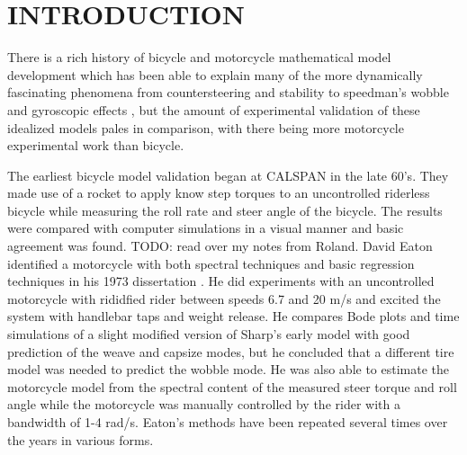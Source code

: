 \documentclass[twocolumn,10pt]{asme2e}
\begin{document}
\section*{INTRODUCTION}

There is a rich history of bicycle and motorcycle mathematical model
development which has been able to explain many of the more dynamically
fascinating phenomena from countersteering and stability to speedman's wobble
and gyroscopic effects \cite{Limebeer2006, Meijaard2007, Meijaard2011}, but the
amount of experimental validation of these idealized models pales in
comparison, with there being more motorcycle experimental work than bicycle.

The earliest bicycle model validation began at CALSPAN in the late 60's. They
made use of a rocket to apply know step torques to an uncontrolled riderless
bicycle while measuring the roll rate and steer angle of the bicycle. The
results were compared with computer simulations in a visual manner and basic
agreement was found. TODO: read over my notes from Roland. David Eaton
identified a motorcycle with both spectral techniques and basic regression
techniques in his 1973 dissertation \cite{Eaton1973}. He did experiments with
an uncontrolled motorcycle with rididfied rider between speeds 6.7 and 20 m/s
and excited the system with handlebar taps and weight release. He compares Bode
plots and time simulations of a slight modified version of Sharp's early model
\cite{Sharp1971} with good prediction of the weave and capsize modes, but he
concluded that a different tire model was needed to predict the wobble mode. He
was also able to estimate the motorcycle model from the spectral content of the
measured steer torque and roll angle while the motorcycle was manually
controlled by the rider with a bandwidth of 1-4 rad/s. Eaton's methods have been
repeated several times over the years in various forms.
\end{document}
